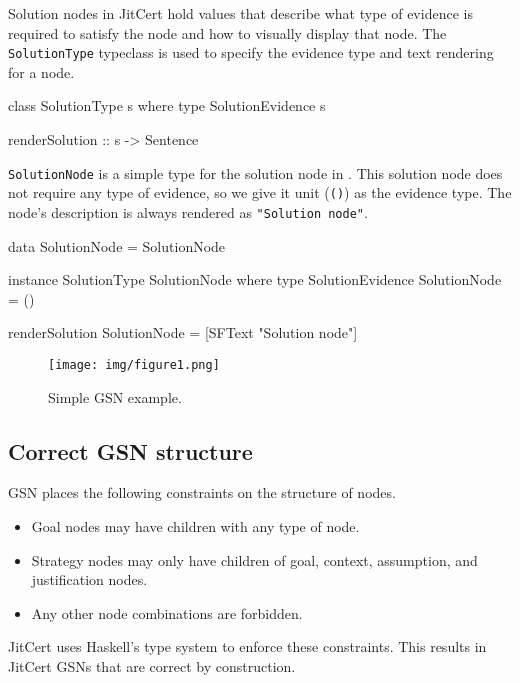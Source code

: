 \documentclass{article}
\newcommand{\jitcert}{JitCert\xspace}
\begin{document}
Solution nodes in JitCert hold values that describe what type of evidence is required to satisfy the node and how to visually display that node. 
The \texttt{SolutionType} typeclass is used to specify the evidence type and text rendering for a node. 
\begin{mcode}
class SolutionType s where
    type SolutionEvidence s

    renderSolution :: s -> Sentence
\end{mcode}
\texttt{SolutionNode} is a simple type for the solution node in .
This solution node does not require any type of evidence, so we give it unit (\texttt{()}) as the evidence type. 
The node's description is always rendered as \texttt{"Solution node"}. 
\begin{mcode}
data SolutionNode = SolutionNode

instance SolutionType SolutionNode where
    type SolutionEvidence SolutionNode = ()

    renderSolution SolutionNode = [SFText "Solution node"]
\end{mcode}

\begin{figure}
\centering
\texttt{[image: img/figure1.png]}
\caption{Simple GSN example.}
\label{fig:fig1}
\end{figure}

\subsection{Correct GSN structure}

GSN places the following constraints on the structure of nodes. 
%
\begin{itemize}
\item Goal nodes may have children with any type of node.
\item Strategy nodes may only have children of goal, context, assumption, and justification nodes.
\item Any other node combinations are forbidden. 
\end{itemize}
%
\jitcert uses Haskell's type system
to enforce these constraints. 
This results in \jitcert GSNs that are correct by construction.

\end{document}
